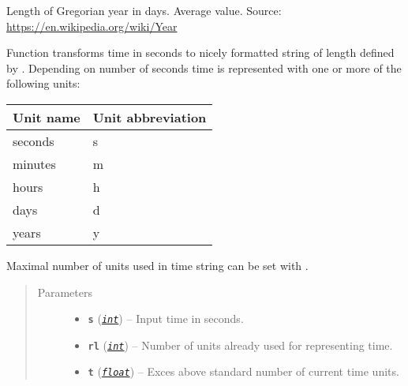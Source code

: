 \documentclass[a4paper,10pt,english]{sphinxmanual}
\begin{document}
\begin{fulllineitems}
\label{aqueduct.utils.log:aqueduct.utils.log.gregorian_year_in_days}
Length of Gregorian year in days. Average value. Source: \url{https://en.wikipedia.org/wiki/Year}

\end{fulllineitems}


\begin{fulllineitems}
\label{aqueduct.utils.log:aqueduct.utils.log.smart_time_string}
Function transforms time in seconds to nicely formatted string of
length defined by . Depending on number of seconds time is represented with
one or more of the following units:

\begin{tabulary}{\linewidth}{|L|L|}
\hline
\textsf{\relax 
Unit name
} & \textsf{\relax 
Unit abbreviation
}\\
\hline
seconds
 & 
s
\\
\hline
minutes
 & 
m
\\
\hline
hours
 & 
h
\\
\hline
days
 & 
d
\\
\hline
years
 & 
y
\\
\hline\end{tabulary}


Maximal number of units used in time string can be set with .
\begin{quote}\begin{description}
\item[{Parameters}] \leavevmode\begin{itemize}
\item {} 
\textbf{\texttt{s}} (\href{http://docs.python.org/2/library/functions.html\#int}{\emph{\texttt{int}}}) -- Input time in seconds.

\item {} 
\textbf{\texttt{rl}} (\href{http://docs.python.org/2/library/functions.html\#int}{\emph{\texttt{int}}}) -- Number of units already used for representing time.

\item {} 
\textbf{\texttt{t}} (\href{http://docs.python.org/2/library/functions.html\#float}{\emph{\texttt{float}}}) -- Exces above standard number of current time units.


\end{itemize}
\end{description}
\end{quote}
\end{fulllineitems}
\end{document}
